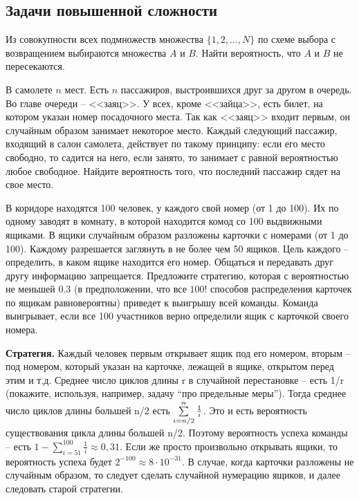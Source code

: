 \subsection{Задачи повышенной сложности}

\begin{problem}
Из совокупности всех подмножеств множества $\{1,2,\ldots,N\}$ по схеме выбора с возвращением выбираются множества $A$ и $B$. 
Найти вероятность, что $A$ и $B$ не пересекаются. 
\end{problem}

\begin{problem}
В самолете $n$ мест. Есть $n$ пассажиров, выстроившихся друг за другом в очередь. Во главе очереди -- <<заяц>>. У всех, 
кроме <<зайца>>, есть билет, на котором указан номер посадочного места. Так как <<заяц>> входит первым, он случайным образом занимает 
некоторое место. Каждый следующий пассажир, входящий в салон самолета, действует по такому принципу: если его место свободно, то 
садится на него, если занято, то занимает с равной вероятностью любое свободное. Найдите вероятность того, что последний пассажир 
сядет на свое место. 
\end{problem}

\begin{problem}
В коридоре находятся 100 человек, у каждого свой номер (от 1 до 100). Их по одному заводят в комнату, в которой 
находится комод со 100 выдвижными ящиками. В ящики случайным образом 
разложены карточки с номерами (от 1 до 100). Каждому разрешается заглянуть в 
не более чем 50 ящиков. Цель каждого -- определить, в каком ящике находится 
его номер. Общаться и передавать друг другу информацию запрещается. 
Предложите стратегию, которая с вероятностью не меньшей $0.3$ (в 
предположении, что все $100!$ способов распределения карточек по ящикам 
равновероятны) приведет к выигрышу всей команды. Команда выигрывает, если 
все 100 участников верно определили ящик с карточкой своего номера.
\end{problem}

\textbf{Стратегия. }Каждый человек первым открывает ящик под его номером, 
вторым -- под номером, который указан на карточке, лежащей в ящике, открытом 
перед этим и т.д. Среднее число циклов длины r в случайной 
перестановке -- есть 1/r (покажите, используя, например, задачу ``про 
предельные меры''). Тогда среднее число циклов длины большей n/2 
есть $\sum\limits_{i=n \mathord{\left/ {\vphantom {n 2}} \right. 
\kern-\nulldelimiterspace} 2}^n {\frac{1}{i}} $. Это и есть вероятность 
существования цикла длины большей n/2. Поэтому вероятность успеха команды -- 
есть $1-\sum\limits_{i=51}^{100} {\frac{1}{i}} \approx 0,31$. Если 
же просто произвольно открывать ящики, то вероятность успеха будет 
$2^{-100}\approx 8\cdot 10^{-31}$. В случае, когда карточки 
разложены не случайным образом, то следует сделать случайной нумерацию 
ящиков, и далее следовать старой стратегии.

